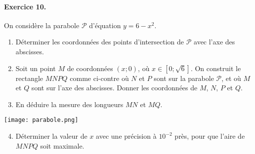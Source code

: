 \documentclass[11pt]{article}
\begin{document}
\paragraph{Exercice 10.} On considère la parabole $\mathscr P$ d'équation
$y=6-x^2$.\\
\begin{minipage}{.75\textwidth}
  \begin{enumerate}
    \item Déterminer les coordonnées des points d'intersection de $\mathscr P$
      avec l'axe des abscisses.
    \item Soit un point $M$ de coordonnées $(x;0)$, où $x\in[0;\sqrt6]$. On
      construit le rectangle $MNPQ$ comme ci-contre où $N$ et $P$ sont sur la
      parabole $\mathscr P$, et où $M$ et $Q$ sont sur l'axe des abscisses.
      Donner les coordonnées de $M$, $N$, $P$ et $Q$.
    \item En déduire la mesure des longueurs $MN$ et $MQ$.
  \end{enumerate}
\end{minipage}
\begin{minipage}{.25\textwidth}
  \begin{center}
\texttt{[image: parabole.png]}
  \end{center}
\end{minipage}
\begin{enumerate}
  \setcounter{enumi}{3}
    \item Déterminer la valeur de $x$ avec une précision à $10^{-2}$ près, pour
      que l'aire de $MNPQ$ soit maximale.
\end{enumerate}
\end{document}
